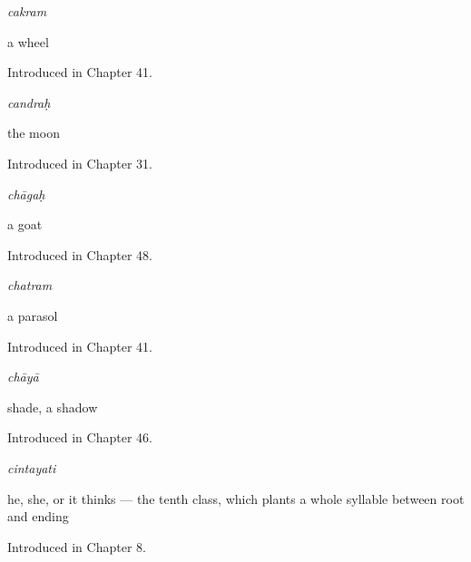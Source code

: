 \noindent\begin{minipage}[t]{\linewidth}
\raggedright
\textbf{}\enspace\emph{cakram}\par
\small a wheel\par
\footnotesize Introduced in Chapter 41.
\end{minipage}\par\medskip

\noindent\begin{minipage}[t]{\linewidth}
\raggedright
\textbf{}\enspace\emph{candraḥ}\par
\small the moon\par
\footnotesize Introduced in Chapter 31.
\end{minipage}\par\medskip

\noindent\begin{minipage}[t]{\linewidth}
\raggedright
\textbf{}\enspace\emph{chāgaḥ}\par
\small a goat\par
\footnotesize Introduced in Chapter 48.
\end{minipage}\par\medskip

\noindent\begin{minipage}[t]{\linewidth}
\raggedright
\textbf{}\enspace\emph{chatram}\par
\small a parasol\par
\footnotesize Introduced in Chapter 41.
\end{minipage}\par\medskip

\noindent\begin{minipage}[t]{\linewidth}
\raggedright
\textbf{}\enspace\emph{chāyā}\par
\small shade, a shadow\par
\footnotesize Introduced in Chapter 46.
\end{minipage}\par\medskip

\noindent\begin{minipage}[t]{\linewidth}
\raggedright
\textbf{}\enspace\emph{cintayati}\par
\small he, she, or it thinks — the tenth class, which plants a whole syllable  between root and ending\par
\footnotesize Introduced in Chapter 8.
\end{minipage}\par\medskip

